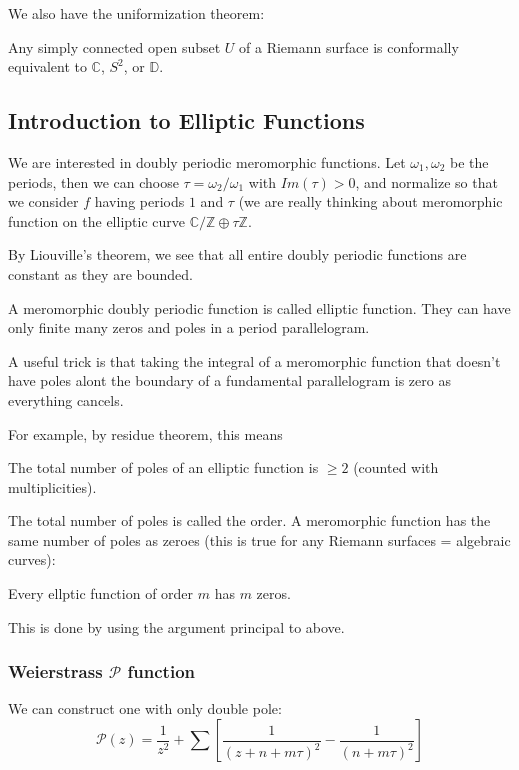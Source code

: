 \documentclass[main.tex]{subfiles}
\begin{document}
We also have the uniformization theorem:

\begin{theorem}
Any simply connected open subset $U$ of a Riemann surface is conformally equivalent to $\mathbb{C}$, $S^2$, or $\mathbb{D}$.
\end{theorem}

\subsection{Introduction to Elliptic Functions}

We are interested in doubly periodic meromorphic functions. Let $\omega_1, \omega_2$ be the periods, then we can choose $\tau = \omega_2/\omega_1$ with $Im(\tau)> 0$, and normalize so that we consider $f$ having periods $1$ and $\tau$ (we are really thinking about meromorphic function on the elliptic curve $\mathbb{C}/\mathbb{Z} \oplus \tau \mathbb{Z}$.

By Liouville's theorem, we see that all entire doubly periodic functions are constant as they are bounded.

A meromorphic doubly periodic function is called elliptic function. They can have only finite many zeros and poles in a period parallelogram.

A useful trick is that taking the integral of a meromorphic function that doesn't have poles alont the boundary of a fundamental parallelogram is zero as everything cancels.

For example, by residue theorem, this means 
\begin{theorem}
The total number of poles of an elliptic function is $\geq 2$ (counted with multiplicities).
\end{theorem}
The total number of poles is called the order.
A meromorphic function has the same number of poles as zeroes (this is true for any Riemann surfaces = algebraic curves):

\begin{theorem}
Every ellptic function of order $m$ has $m$ zeros.
\end{theorem}

This is done by using the argument principal to above.

\subsubsection{Weierstrass $\mathcal{P}$ function}

We can construct one with only double pole:
$$
\mathcal{P}(z) = \frac{1}{z^2} + \sum [\frac{1}{(z + n + m \tau)^2} - \frac{1}{(n + m\tau)^2}]
$$
\end{document}

